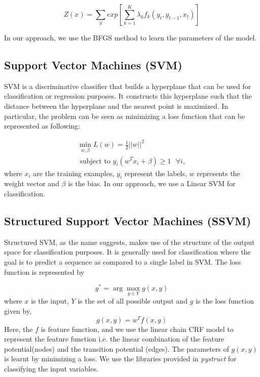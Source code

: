 \documentclass[11pt, oneside]{article}   	%
\begin{document}

\begin{equation}
Z(x)=\sum_{y}^{}exp\left[{\sum_{k=1}^{K}}{\lambda}_{k}{f}_{k}({y}_{t},{y}_{t-1},{x}_{t})\right]
\end{equation}

In our approach, we use the BFGS method to learn the parameters of the model. 

\subsection{Support Vector Machines (SVM)}  
SVM is a discriminative classifier that builds a hyperplane that can be used for classification or regression purposes. It constructs this hyperplane such that 
the distance between the hyperplane and the nearest point is maximized.  In particular, the problem can be seen as minimizing a loss function that can be represented as following:

\begin{align*}
\min_{w, \beta} L(w) = \frac{1}{2}||w||^{2} \\ 
\text{ subject to } y_{i}(w^{T} x_{i} + \beta) \geq 1 \text{ } \forall i,
\end{align*}
where $x_i$ are the training examples, $y_i$ represent the labels, $w$ represents the weight vector and $\beta$ is the bias. In our approach, we use
a Linear SVM for classification.
 
\subsection{Structured Support Vector Machines (SSVM)}
Structured SVM, as the name suggests, makes use of the structure of the output space for classification purposes. It is generally used for classification where the goal is to predict a sequence as compared to a single label in SVM. The loss function is represented by

\begin{equation}
y^* = \arg \max_{y \in Y} g(x, y)
\end{equation}
where $x$ is the input, $Y$ is the set of all possible output and $g$ is the loss function given by,
\begin{equation}
g(x, y) = w^T f(x, y)
\end{equation}
Here, the $f$ is feature function, and we use the linear chain CRF model to represent the feature function i.e. the linear combination of the feature potential(nodes) and the transition potential (edges). The parameters of $g(x,y)$ is learnt by minimizing a loss. We use the libraries provided in \emph{pystruct} for classifying the input variables.
\end{document}
